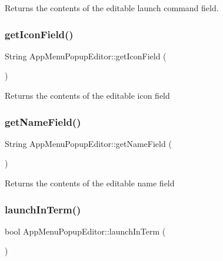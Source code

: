 \begin{DoxyReturn}{Returns}
the contents of the editable launch command field. 
\end{DoxyReturn}
\mbox{\label{classAppMenuPopupEditor_af8cbacf3c88652bf3862650fab2e5674}} 
\subsubsection{\texorpdfstring{get\+Icon\+Field()}{getIconField()}}
{\footnotesize\ttfamily String App\+Menu\+Popup\+Editor\+::get\+Icon\+Field (\begin{DoxyParamCaption}{ }\end{DoxyParamCaption})}

\begin{DoxyReturn}{Returns}
the contents of the editable icon field 
\end{DoxyReturn}
\mbox{\label{classAppMenuPopupEditor_a3fd8f686ba239fb51bfbc2ef20b5f750}} 
\subsubsection{\texorpdfstring{get\+Name\+Field()}{getNameField()}}
{\footnotesize\ttfamily String App\+Menu\+Popup\+Editor\+::get\+Name\+Field (\begin{DoxyParamCaption}{ }\end{DoxyParamCaption})}

\begin{DoxyReturn}{Returns}
the contents of the editable name field 
\end{DoxyReturn}
\mbox{\label{classAppMenuPopupEditor_ab3a31014001312e2280f1c7b8e0e50f0}} 
\subsubsection{\texorpdfstring{launch\+In\+Term()}{launchInTerm()}}
{\footnotesize\ttfamily bool App\+Menu\+Popup\+Editor\+::launch\+In\+Term (\begin{DoxyParamCaption}{ }\end{DoxyParamCaption})}

